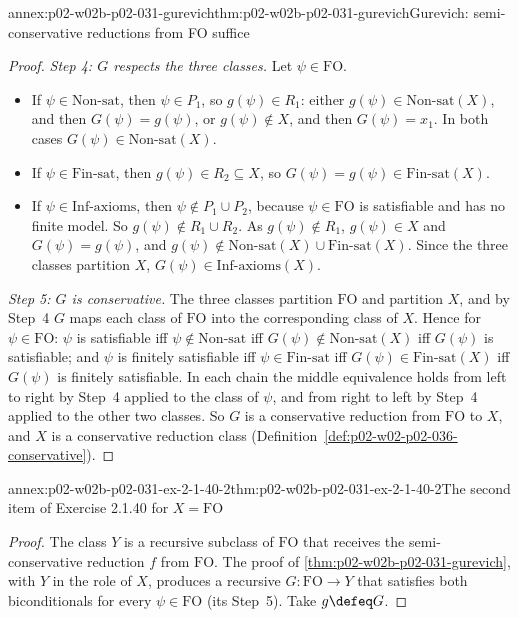 \begin{annexitem}{annex:p02-w02b-p02-031-gurevich}{thm:p02-w02b-p02-031-gurevich}{Gurevich: semi-conservative reductions from FO suffice}
\begin{proof}
\emph{Step 4: \(G\) respects the three classes.}  Let \(\psi\in\mathrm{FO}\).
\begin{itemize}
\item If \(\psi\in\mathrm{Non\text{-}sat}\), then \(\psi\in P_1\), so
  \(g(\psi)\in R_1\): either \(g(\psi)\in\mathrm{Non\text{-}sat}(X)\), and then
  \(G(\psi)=g(\psi)\), or \(g(\psi)\notin X\), and then \(G(\psi)=x_1\).  In
  both cases \(G(\psi)\in\mathrm{Non\text{-}sat}(X)\).
\item If \(\psi\in\mathrm{Fin\text{-}sat}\), then \(g(\psi)\in R_2\subseteq
  X\), so \(G(\psi)=g(\psi)\in\mathrm{Fin\text{-}sat}(X)\).
\item If \(\psi\in\mathrm{Inf\text{-}axioms}\), then \(\psi\notin P_1\cup P_2\),
  because \(\psi\in\mathrm{FO}\) is satisfiable and has no finite model.  So
  \(g(\psi)\notin R_1\cup R_2\).  As \(g(\psi)\notin R_1\), \(g(\psi)\in X\)
  and \(G(\psi)=g(\psi)\), and \(g(\psi)\notin\mathrm{Non\text{-}sat}(X)\cup
  \mathrm{Fin\text{-}sat}(X)\).  Since the three classes partition \(X\),
  \(G(\psi)\in\mathrm{Inf\text{-}axioms}(X)\).
\end{itemize}

\emph{Step 5: \(G\) is conservative.}  The three classes partition
\(\mathrm{FO}\) and partition \(X\), and by Step~4 \(G\) maps each class of
\(\mathrm{FO}\) into the corresponding class of \(X\).  Hence for
\(\psi\in\mathrm{FO}\): \(\psi\) is satisfiable iff \(\psi\notin
\mathrm{Non\text{-}sat}\) iff \(G(\psi)\notin\mathrm{Non\text{-}sat}(X)\) iff
\(G(\psi)\) is satisfiable; and \(\psi\) is finitely satisfiable iff
\(\psi\in\mathrm{Fin\text{-}sat}\) iff \(G(\psi)\in\mathrm{Fin\text{-}sat}(X)\)
iff \(G(\psi)\) is finitely satisfiable.  In each chain the middle equivalence
holds from left to right by Step~4 applied to the class of \(\psi\), and from
right to left by Step~4 applied to the other two classes.  So \(G\) is a
conservative reduction from \(\mathrm{FO}\) to \(X\), and \(X\) is a
conservative reduction class
(Definition~\ref{def:p02-w02-p02-036-conservative}).
\end{proof}
\end{annexitem}

\begin{annexitem}{annex:p02-w02b-p02-031-ex-2-1-40-2}{thm:p02-w02b-p02-031-ex-2-1-40-2}{The second item of Exercise 2.1.40 for \(X=\mathrm{FO}\)}
\begin{proof}
The class \(Y\) is a recursive subclass of \(\mathrm{FO}\) that receives the
semi-conservative reduction \(f\) from \(\mathrm{FO}\).  The proof of
\cref{thm:p02-w02b-p02-031-gurevich}, with \(Y\) in the role of \(X\), produces
a recursive \(G:\mathrm{FO}\to Y\) that satisfies both biconditionals for every
\(\psi\in\mathrm{FO}\) (its Step~5).  Take \(g\defeq G\).
\end{proof}
\end{annexitem}


